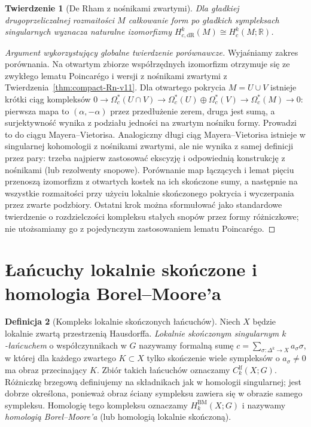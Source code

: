 \documentclass[11pt,a4paper,oneside]{report}
\newcommand{\R}{\mathbb{R}}
\theoremstyle{plain}
\newtheorem{twierdzenie}{Twierdzenie}[section]
\theoremstyle{definition}
\newtheorem{definicja}[twierdzenie]{Definicja}
\theoremstyle{remark}
\begin{document}
\begin{twierdzenie}[De Rham z nośnikami zwartymi]
\label{thm:compact-deRham-v11}
Dla gładkiej drugoprzeliczalnej rozmaitości $M$ całkowanie
form po gładkich sympleksach singularnych wyznacza
naturalne izomorfizmy
$H_{c,\mathrm{dR}}^k(M)\cong H_c^k(M;\R)$.
\end{twierdzenie}
\begin{proof}[Argument wykorzystujący globalne twierdzenie porównawcze]
Wyjaśniamy zakres porównania. Na otwartym zbiorze
współrzędnych izomorfizm otrzymuje się ze zwykłego
lematu Poincarégo i wersji z nośnikami zwartymi
z Twierdzenia~\ref{thm:compact-Rn-v11}.
Dla otwartego pokrycia $M=U\cup V$ istnieje krótki ciąg
kompleksów
$0\to\Omega_c^*(U\cap V)\to
\Omega_c^*(U)\oplus\Omega_c^*(V)\to
\Omega_c^*(M)\to0$:
pierwsza mapa to $(\alpha,-\alpha)$ przez przedłużenie
zerem, druga jest sumą, a surjektywność wynika z podziału
jedności na zwartym nośniku formy. Prowadzi to do ciągu
Mayera--Vietorisa. Analogiczny długi ciąg Mayera--Vietorisa istnieje
w singularnej kohomologii z nośnikami zwartymi,
ale nie wynika z samej definicji przez pary:
trzeba najpierw zastosować ekscyzję i odpowiednią
konstrukcję z nośnikami (lub rezolwenty snopowe).
Porównanie map łączących i lemat pięciu przenoszą
izomorfizm z otwartych kostek na ich skończone sumy,
a następnie na wszystkie rozmaitości przy użyciu
lokalnie skończonego pokrycia i wyczerpania przez
zwarte podzbiory. Ostatni krok można sformułować jako
standardowe twierdzenie o rozdzielczości kompleksu
stałych snopów przez formy różniczkowe; nie utożsamiamy
go z pojedynczym zastosowaniem lematu Poincarégo.
\end{proof}

\section{Łańcuchy lokalnie skończone i homologia Borel--Moore'a}
\begin{definicja}[Kompleks lokalnie skończonych łańcuchów]
\label{def:BM-chain-v11}
Niech $X$ będzie lokalnie zwartą przestrzenią Hausdorffa.
\emph{Lokalnie skończonym singularnym $k$-łańcuchem}
o współczynnikach w $G$ nazywamy formalną sumę
$c=\sum_{\sigma:\Delta^k\to X}a_\sigma\sigma$,
w której dla każdego zwartego $K\subset X$ tylko
skończenie wiele sympleksów o $a_\sigma\ne0$
ma obraz przecinający $K$. Zbiór takich łańcuchów
oznaczamy $C_k^{\mathrm{lf}}(X;G)$.
Różniczkę brzegową definiujemy na składnikach jak
w homologii singularnej; jest dobrze określona,
ponieważ obraz ściany sympleksu zawiera się w obrazie
samego sympleksu. Homologię tego kompleksu oznaczamy
$H_k^{\mathrm{BM}}(X;G)$ i nazywamy
\emph{homologią Borel--Moore'a} (lub homologią lokalnie skończoną).
\end{definicja}
\end{document}
